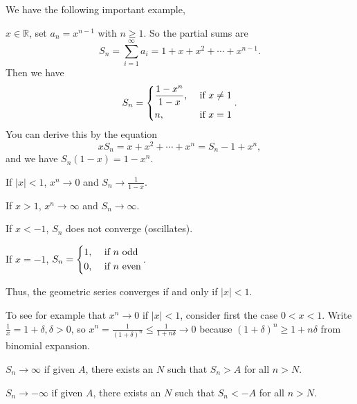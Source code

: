We have the following important example,
\begin{example}
    \(x\in\mathbb{R}\), set \(a_n = x^{n-1}\) with \(n\geq 1\). So the partial sums are
    \[
        S_n = \sum\limits_{i=1}^{\infty} a_i = 1 + x + x^2 + \cdots + x^{n-1}.
    \]
    Then we have
    \[
        S_n = \begin{dcases}
            \frac{1-x^n}{1-x}, &\text{ if } x\neq 1\\
            n, &\text{ if } x = 1\\
        \end{dcases}.
    \]
    You can derive this by the equation
    \[
        xS_n = x + x^2 + \cdots + x^n = S_n - 1 + x^n,
    \]
    and we have \(S_n(1-x) = 1-x^n\).

    If \(\left\vert x \right\vert <1\), \(x^n\to 0\) and \(S_n \to \frac{1}{1-x}\).
    
    If \(x > 1\), \(x^n \to \infty\) and \(S_n \to \infty\).

    If \(x<-1\), \(S_n\) does not converge (oscillates).

    If \(x=-1\), \(S_n=\begin{dcases}
        1, &\text{ if } n \text{ odd}\\
        0, &\text{ if } n \text{ even}\\
    \end{dcases}\).

    Thus, the geometric series converges if and only if \(\left\vert x \right\vert < 1\).

    To see for example that \(x^n \to 0\) if \(\left\vert x \right\vert <1\), consider first the case \(0< x< 1\). Write \(\frac{1}{x}=1 + \delta, \delta>0\), so \(x^n = \frac{1}{(1+\delta)^n}\leq \frac{1}{1+n\delta}\to 0\) because \((1+\delta)^n \geq 1 + n\delta\) from binomial expansion.
\end{example}

\begin{definition}
    \leavevmode
    \(S_n \to \infty\) if given \(A\), there exists an \(N\) such that \(S_n > A\) for all \(n > N\).

    \(S_n \to -\infty\) if given \(A\), there exists an \(N\) such that \(S_n < -A\) for all \(n > N\).
\end{definition}

